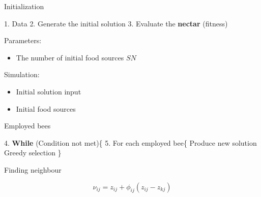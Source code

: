 \documentclass[14pt,ignorenonframetext,compress]{beamer}
\newenvironment{Shaded}{\begin{snugshade}}{\end{snugshade}}
\newcommand{\FloatTok}[1]{\textcolor[rgb]{0.00,0.00,0.81}{#1}}
\newcommand{\KeywordTok}[1]{\textcolor[rgb]{0.13,0.29,0.53}{\textbf{#1}}}
\newcommand{\NormalTok}[1]{#1}
\providecommand{\tightlist}{%
  \setlength{\itemsep}{0pt}\setlength{\parskip}{0pt}}
\renewenvironment{Shaded}{\color{black}\begin{snugshade}\color{black}}{\end{snugshade}}
\begin{document}
\begin{frame}[fragile]{Initialization}
\protect\hypertarget{initialization}{}

\begin{Shaded}
\begin{Highlighting}[]
 \FloatTok{1.}\NormalTok{ Data}
 \FloatTok{2.}\NormalTok{ Generate the initial solution}
 \FloatTok{3.}\NormalTok{ Evaluate the }\KeywordTok{nectar}\NormalTok{ (fitness)}
\end{Highlighting}
\end{Shaded}

Parameters:

\begin{itemize}
\tightlist
\item
  The number of initial food sources \(SN\)
\end{itemize}

Simulation:

\begin{itemize}
\tightlist
\item
  Initial solution input\\
\item
  Initial food sources
\end{itemize}

\end{frame}

\begin{frame}[fragile]{Employed bees}
\protect\hypertarget{employed-bees}{}

\begin{Shaded}
\begin{Highlighting}[]
 \FloatTok{4.} \KeywordTok{While}\NormalTok{ (Condition not met)\{}
 \FloatTok{5.}\NormalTok{ For each employed bee\{}
\NormalTok{     Produce new solution }
\NormalTok{     Greedy selection \}}
\end{Highlighting}
\end{Shaded}

\begin{block}{Finding neighbour}

\[\nu_{ij} = z_{ij} + \phi_{ij}(z_{ij}-z_{kj})\]

\end{block}

\end{frame}
\end{document}
